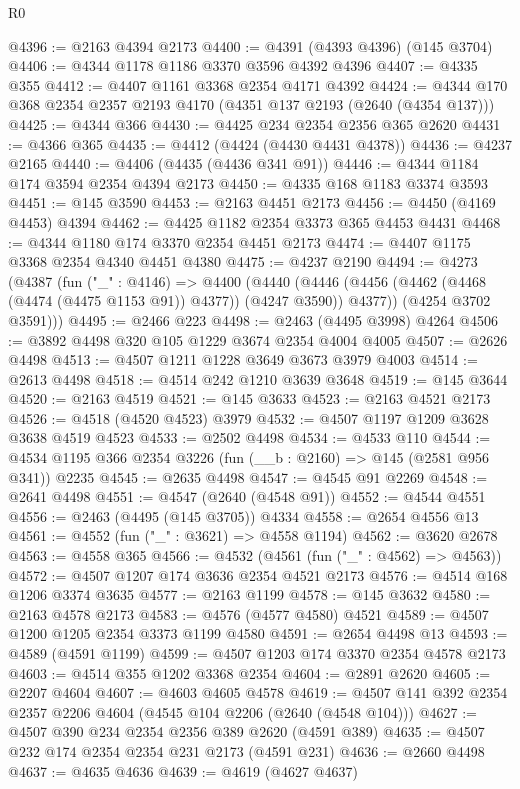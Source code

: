 \begin{lexlean}{R0}
\begin{coremodule}
@4396 := @2163 @4394 @2173
@4400 := @4391 (@4393 @4396) (@145 @3704)
@4406 := @4344 @1178 @1186 @3370 @3596 @4392 @4396
@4407 := @4335 @355
@4412 := @4407 @1161 @3368 @2354 @4171 @4392
@4424 := @4344 @170 @368 @2354 @2357 @2193 @4170 (@4351 @137 @2193 (@2640 (@4354 @137)))
@4425 := @4344 @366
@4430 := @4425 @234 @2354 @2356 @365 @2620
@4431 := @4366 @365
@4435 := @4412 (@4424 (@4430 @4431 @4378))
@4436 := @4237 @2165
@4440 := @4406 (@4435 (@4436 @341 @91))
@4446 := @4344 @1184 @174 @3594 @2354 @4394 @2173
@4450 := @4335 @168 @1183 @3374 @3593
@4451 := @145 @3590
@4453 := @2163 @4451 @2173
@4456 := @4450 (@4169 @4453) @4394
@4462 := @4425 @1182 @2354 @3373 @365 @4453 @4431
@4468 := @4344 @1180 @174 @3370 @2354 @4451 @2173
@4474 := @4407 @1175 @3368 @2354 @4340 @4451 @4380
@4475 := @4237 @2190
@4494 := @4273
    (@4387
      (fun ("_" : @4146) =>
      @4400
        (@4440 (@4446 (@4456 (@4462 (@4468 (@4474 (@4475 @1153 @91)) @4377)) (@4247 @3590)) @4377))
        (@4254 @3702 @3591)))
@4495 := @2466 @223
@4498 := @2463 (@4495 @3998) @4264
@4506 := @3892 @4498 @320 @105 @1229 @3674 @2354 @4004 @4005
@4507 := @2626 @4498
@4513 := @4507 @1211 @1228 @3649 @3673 @3979 @4003
@4514 := @2613 @4498
@4518 := @4514 @242 @1210 @3639 @3648
@4519 := @145 @3644
@4520 := @2163 @4519
@4521 := @145 @3633
@4523 := @2163 @4521 @2173
@4526 := @4518 (@4520 @4523) @3979
@4532 := @4507 @1197 @1209 @3628 @3638 @4519 @4523
@4533 := @2502 @4498
@4534 := @4533 @110
@4544 := @4534 @1195 @366 @2354 @3226 (fun (__b : @2160) => @145 (@2581 @956 @341)) @2235
@4545 := @2635 @4498
@4547 := @4545 @91 @2269
@4548 := @2641 @4498
@4551 := @4547 (@2640 (@4548 @91))
@4552 := @4544 @4551
@4556 := @2463 (@4495 (@145 @3705)) @4334
@4558 := @2654 @4556 @13
@4561 := @4552 (fun ("_" : @3621) => @4558 @1194)
@4562 := @3620 @2678
@4563 := @4558 @365
@4566 := @4532 (@4561 (fun ("_" : @4562) => @4563))
@4572 := @4507 @1207 @174 @3636 @2354 @4521 @2173
@4576 := @4514 @168 @1206 @3374 @3635
@4577 := @2163 @1199
@4578 := @145 @3632
@4580 := @2163 @4578 @2173
@4583 := @4576 (@4577 @4580) @4521
@4589 := @4507 @1200 @1205 @2354 @3373 @1199 @4580
@4591 := @2654 @4498 @13
@4593 := @4589 (@4591 @1199)
@4599 := @4507 @1203 @174 @3370 @2354 @4578 @2173
@4603 := @4514 @355 @1202 @3368 @2354
@4604 := @2891 @2620
@4605 := @2207 @4604
@4607 := @4603 @4605 @4578
@4619 := @4507 @141 @392 @2354 @2357 @2206 @4604 (@4545 @104 @2206 (@2640 (@4548 @104)))
@4627 := @4507 @390 @234 @2354 @2356 @389 @2620 (@4591 @389)
@4635 := @4507 @232 @174 @2354 @2354 @231 @2173 (@4591 @231)
@4636 := @2660 @4498
@4637 := @4635 @4636
@4639 := @4619 (@4627 @4637)

\end{coremodule}
\end{lexlean}
